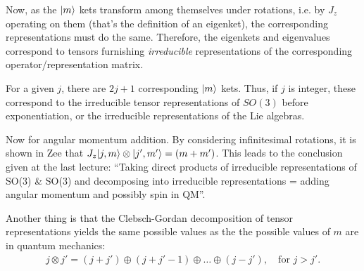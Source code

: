Now, as the $\lvert m\rangle$ kets transform among themselves under rotations, i.e. by $J_z$ operating on them (that's the definition of an eigenket), the corresponding representations must do the same. Therefore, the eigenkets and eigenvalues correspond to tensors furnishing \textit{irreducible} representations of the corresponding operator/representation matrix. 

For a given $j$, there are $2j+1$ corresponding $\lvert m\rangle$ kets. Thus, if $j$ is integer, these correspond to the irreducible tensor representations of $SO(3)$ before exponentiation, or the irreducible representations of the Lie algebras. 

Now for angular momentum addition. By considering infinitesimal rotations, it is shown in Zee that $J_z \lvert j, m\rangle \otimes \lvert j', m'\rangle = (m+m')$. This leads to the conclusion given at the last lecture: “Taking direct products of irreducible representations of SO(3) \& SO(3) and decomposing into irreducible representations = adding angular momentum and possibly spin in QM”.

Another thing is that the Clebsch-Gordan decomposition of tensor representations yields the same possible values as the the possible values of $m$ are in quantum mechanics:
\begin{align}
	j \otimes j' = (j+j') \oplus (j+j'-1) \oplus \dots \oplus (j-j'), \quad \text{for } j > j'.
\end{align}